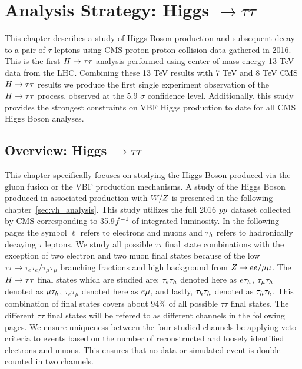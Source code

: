 \chapter{Analysis Strategy: Higgs $\to \tau\tau$}

This chapter describes a study of Higgs Boson production and subsequent
decay to a pair of $\tau$ leptons using CMS proton-proton collision data gathered in 2016.  This is the first
$H\to\tau\tau$ analysis performed using center-of-mass energy 13 TeV data from the LHC. Combining
these 13 TeV results with 7 TeV and 8 TeV CMS $H\to\tau\tau$ results we produce
the first single experiment observation of the $H\to\tau\tau$ process, observed at the 5.9 $\sigma$
confidence level.  Additionally, this study provides the strongest constraints on VBF Higgs 
production to date for all CMS Higgs Boson analyses.

\section{Overview: Higgs $\to \tau\tau$}

This chapter specifically focuses on studying the Higgs Boson produced via the gluon fusion
or the VBF production mechanisms.  A study of the Higgs Boson produced in associated production with
$W/Z$ is presented in the following chapter~\ref{sec:vh_analysis}. This study utilizes the
full 2016 $pp$ dataset collected by CMS corresponding to 35.9$f^{-1}$ of integrated luminosity.
In the following pages the symbol $\ell$ refers to electrons and muons and $\tau_{h}$ refers to hadronically
decaying $\tau$ leptons.  We study all possible $\tau\tau$ final state combinations with the
exception of two electron and two muon final states because of the low 
$\tau\tau \to \tau_{e}\tau_{e}/\tau_{\mu}\tau_{\mu}$
branching fractions and high background from $Z \to ee/\mu\mu$.  The $H\to\tau\tau$ final states which are
studied are: $\tau_{e}\tau_{h}$ denoted here as $e\tau_{h}$, $\tau_{\mu}\tau_{h}$ denoted as $\mu\tau_{h}$,
$\tau_{e}\tau_{\mu}$ denoted here as $e\mu$, and lastly, $\tau_{h}\tau_{h}$ denoted as $\tau_{h}\tau_{h}$.
This combination of final states covers about 94\% of all possible $\tau\tau$ final states.
The different $\tau\tau$ final states will be refered to as different channels in the following pages.
We ensure uniqueness between the four studied channels be applying veto criteria to events based
on the number of reconstructed and loosely identified electrons and muons.  This ensures that 
no data or simulated event is double counted in two channels.

